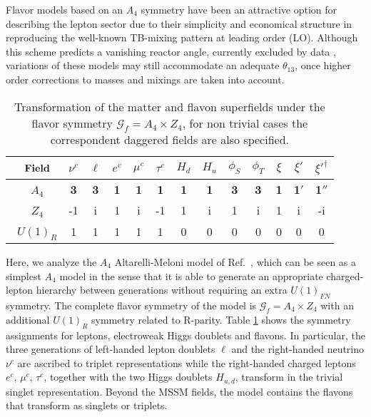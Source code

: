 \documentclass[a4paper,11pt]{article}
\begin{document}
Flavor models based on an $A_4$ symmetry \cite{Altarelli:2005yx, Altarelli:2009kr, Altarelli:2005yp, Ma:2001dn, Babu:2002dz, Ma:2004zv, He:2006dk, Babu:2005se, Zee:2005ut, Ma:2005qf, King:2006np, Altarelli:2006kg, Hirsch:2007kh, Bazzocchi:2007na, Honda:2008rs, Bazzocchi:2008rz, Hirsch:2008rp, Lin:2008aj, Csaki:2008qq, Feruglio:2008ht, Morisi:2007ft, Hirsch:2005mc, Hirsch:2003dr, Chen:2009um, Hirsch:2003xx} have been an attractive option for describing the lepton sector due to their simplicity and economical structure in reproducing the well-known TB-mixing pattern at leading order (LO). Although this scheme predicts a vanishing reactor angle, currently excluded by data \cite{Abe:2014bwa, An:2015rpe, RENO:2015ksa}, variations of these models \cite{Lin:2009bw, Cooper:2012wf, Hernandez:2012ra, King:2011zj, Zheng:2011uz, Ma:2011yi, Rodejohann:2011uz, Ahn:2011if, Kumar:2011vf, Gupta:2011ct, Branco:2012vs, Ahn:2012tv, Altarelli:2008bg} may still accommodate an adequate $\theta_{13}$, once higher order corrections to masses and mixings are taken into account.  


\begin{table}[t!]
\centering 
\begin{tabular}{|c||c|c|c|c|c||c|c||c|c|c|c|c|}
\hline
~${\bf Field}$ & $\nu^c$ & $\ell$ & $e^c$ & $\mu^c$ & $\tau^c$ & $H_d$ & $H_u$ & $\phi_S$  & $\phi_T$ & $\xi$ & $\xi'$ & $\xi'^\dagger $  \\ 
\hline
\hline
~$A_4$    & \bf 3 & \bf 3 & \bf 1 & \bf 1 & \bf 1 & \bf 1 & \bf 1 & \bf 3 & \bf 3 & \bf 1 & \bf 1$'$  & \bf 1$''$  \\
~$Z_4$    &    -1 &     i &     1 &     i &    -1 &     1 &     i &     1 &     i  &     1 &   i &   -i  \\
~$U(1)_R$ &     1 &     1 &     1 &     1 &      1 &     0 &    0 &     0 &     0  &     0 &    0 &  0  \\
\hline
\end{tabular}
\caption{Transformation of the matter and flavon superfields under the flavor symmetry $\mathcal{G}_f=A_4\times Z_4$, for non trivial cases the correspondent daggered fields are also specified.}
\label{tab:A4pc}
\end{table}

Here, we analyze the $A_4$ Altarelli-Meloni model of Ref.~\cite{Altarelli:2009kr}, which can be seen as a simplest $A_4$ model in the sense that it is able to generate an appropriate charged-lepton hierarchy between generations without requiring an extra $U(1)_{FN}$ symmetry. The complete flavor symmetry of the model is $\mathcal{G}_f=A_4\times Z_4$ with an additional $U(1)_R$ symmetry related to R-parity. Table \ref{tab:A4pc} shows the symmetry assignments for leptons, electroweak Higgs doublets and flavons. In particular, the three generations of left-handed lepton doublets $\ell$ and the right-handed neutrino $\nu^c$ are ascribed to triplet representations while the right-handed charged leptons $e^c$, $\mu^c$, $\tau^c$, together with the two Higgs doublets $H_{u,d}$, transform in the trivial singlet representation. Beyond the MSSM fields, the model contains  the flavons that transform as singlets or triplets.
\end{document}
